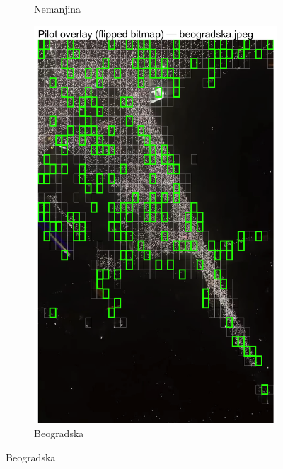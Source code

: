 \documentclass[a4paper,12pt]{article}
\begin{document}
\begin{figure}[H]
\begin{subfigure}[b]{0.3\textwidth}
	  \caption{Nemanjina}
	  \label{fig:nemanjina}
	\end{subfigure}
	\hfill
	\begin{subfigure}[b]{0.3\textwidth}
		\centering
		\includegraphics[width=\textwidth]{../outputs/sampling_outputs/main_overlays_image/main_overlay_beogradska.png}
		\caption{Beogradska}
		\label{fig:beogradska}
	\end{subfigure}
  
	\vspace{0.3cm} %
  

\end{figure}
\end{document}
